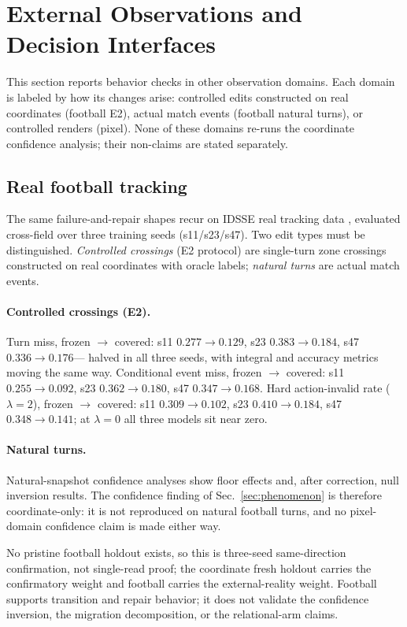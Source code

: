 \section{External Observations and Decision Interfaces}
\label{sec:external}

This section reports behavior checks in other observation domains. Each
domain is labeled by how its changes arise: controlled edits constructed
on real coordinates (football E2), actual match events (football natural
turns), or controlled renders (pixel). None of these domains re-runs the
coordinate confidence analysis; their non-claims are stated separately.

\subsection{Real football tracking}
\label{sec:football}

The same failure-and-repair shapes recur on IDSSE real tracking data \citep{bassek2025idsse},
evaluated cross-field over three training seeds (s11/s23/s47). Two edit
types must be distinguished. \emph{Controlled crossings} (E2 protocol) are
single-turn zone crossings constructed on real coordinates with oracle
labels; \emph{natural turns} are actual match events.

\paragraph{Controlled crossings (E2).} Turn miss, frozen $\to$ covered:
s11 $0.277 \to 0.129$, s23 $0.383 \to 0.184$, s47 $0.336 \to 0.176$---
halved in all three seeds, with integral and accuracy metrics moving the
same way. Conditional event miss, frozen $\to$ covered: s11 $0.255 \to
0.092$, s23 $0.362 \to 0.180$, s47 $0.347 \to 0.168$. Hard action-invalid
rate ($\lambda{=}2$), frozen $\to$ covered: s11 $0.309 \to 0.102$, s23
$0.410 \to 0.184$, s47 $0.348 \to 0.141$; at $\lambda{=}0$ all three
models sit near zero.

\paragraph{Natural turns.} Natural-snapshot confidence analyses show floor
effects and, after correction, null inversion results. The confidence
finding of Sec.~\ref{sec:phenomenon} is therefore coordinate-only: it is
not reproduced on natural football turns, and no pixel-domain confidence
claim is made either way.

No pristine football holdout exists, so this is three-seed same-direction
confirmation, not single-read proof; the coordinate fresh holdout carries
the confirmatory weight and football carries the external-reality weight.
Football supports transition and repair behavior; it does not validate the
confidence inversion, the migration decomposition, or the relational-arm
claims.

